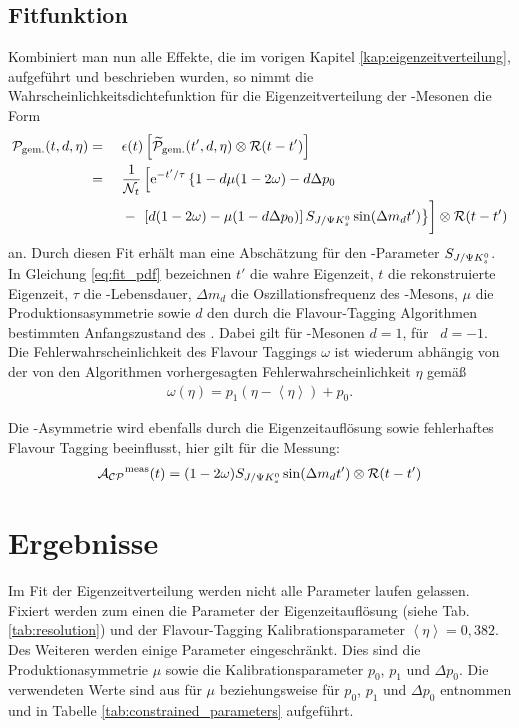 \subsection{Fitfunktion}
Kombiniert man nun alle Effekte, die im vorigen Kapitel \ref{kap:eigenzeitverteilung}, aufgeführt und beschrieben wurden, so nimmt die Wahrscheinlichkeitsdichtefunktion für die Eigenzeitverteilung der \Bd-Mesonen die Form
\begin{alignat}{3}
\nonumber\mathcal{P}_{\text{gem.}}(t, d, \eta) &=\  &&  \epsilon(t)\left[\widetilde{\mathcal{P}}_{\text{gem.}}(t', d, \eta) \otimes \mathcal{R}(t-t')\right]\\
\nonumber &= &&\frac{1}{\mathcal{N}_t}\left[\e^{-t'/\tau} \left\lbrace 1-d\mu(1-2\omega)-d\Delta p_0 \right.\right.\\
& &&-\left.\vphantom{\frac{1}{\mathcal{N}_t}}\left.\left[d(1-2\omega)-\mu(1-d\Delta p_0)\right]\SJPsi\sin(\Delta m_d t')\right\rbrace\right]\otimes\mathcal{R}(t-t') \label{eq:fit_pdf}
\end{alignat}
an. Durch diesen Fit erhält man eine Abschätzung für den \CP-Parameter $S_{J/\Psi K_s^0}$. In Gleichung \ref{eq:fit_pdf} bezeichnen $t'$ die wahre Eigenzeit, $t$ die rekonstruierte Eigenzeit, $\tau$ die \Bd-Lebensdauer, $\Delta m_d$ die Oszillationsfrequenz des \Bd-Mesons, $\mu$ die Produktionsasymmetrie sowie $d$ den durch die Flavour-Tagging Algorithmen bestimmten Anfangszustand des \Bd. Dabei gilt für \Bd-Mesonen $d=1$, für \Bdbar\ $d=-1$. Die Fehlerwahrscheinlichkeit des Flavour Taggings $\omega$ ist wiederum abhängig von der von den Algorithmen vorhergesagten Fehlerwahrscheinlichkeit $\eta$ gemäß
\begin{align}
\omega(\eta) = p_1\left(\eta-\left\langle\eta\right\rangle\right) + p_0.
\end{align}

Die \CP-Asymmetrie wird ebenfalls durch die Eigenzeitauflösung sowie fehlerhaftes Flavour Tagging beeinflusst, hier gilt für die Messung:
\begin{align}
\mathcal{A_{CP}}^{\text{meas}}(t) = (1-2\omega)S_{J/\Psi K_s^0} \sin(\Delta m_d t') \otimes \mathcal{R}(t-t') \label{eq:cp_asymm_meas}
\end{align}


\section{Ergebnisse} \label{kap:fitergebnis}
Im Fit der Eigenzeitverteilung werden nicht alle Parameter laufen gelassen. Fixiert werden zum einen die Parameter der Eigenzeitauflösung (siehe Tab. \ref{tab:resolution}) und der Flavour-Tagging Kalibrationsparameter $\left\langle\eta\right\rangle = 0,382$. Des Weiteren werden einige Parameter eingeschränkt. Dies sind die Produktionasymmetrie $\mu$ sowie die Kalibrationsparameter $p_0$, $p_1$ und $\Delta p_0$. Die verwendeten Werte sind aus \cite{lhcb-paper} für $\mu$ beziehungsweise \cite{tagging} für $p_0$, $p_1$ und $\Delta p_0$ entnommen und in Tabelle \ref{tab:constrained_parameters} aufgeführt.

